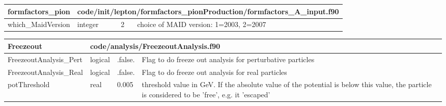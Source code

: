 \documentclass{article}
\begin{document}
\begin{longtable}{llll}
\toprule
\textbf{\large{formfactors\_pion}} & \multicolumn{3}{l}{\footnotesize{code/init/lepton/formfactors\_pionProduction/formfactors\_A\_input.f90}}\\*
\midrule
\endfirsthead
\midrule
\endhead
which\_MaidVersion & \begin{minipage}[t]{2cm}integer\end{minipage} & \begin{minipage}[t]{2cm}2\end{minipage} & \begin{minipage}[t]{12cm}choice of MAID version:  1=2003, 2=2007\end{minipage}\\*
\bottomrule
\end{longtable}
{ }




\begin{longtable}{llll}
\toprule
\textbf{\large{Freezeout}} & \multicolumn{3}{l}{\footnotesize{code/analysis/FreezeoutAnalysis.f90}}\\*
\midrule
\endfirsthead
\midrule
\endhead
FreezeoutAnalysis\_Pert & \begin{minipage}[t]{2cm}logical\end{minipage} & \begin{minipage}[t]{2cm}.false.\end{minipage} & \begin{minipage}[t]{12cm}Flag to do freeze out analysis for perturbative particles\end{minipage}\\*
\midrule
FreezeoutAnalysis\_Real & \begin{minipage}[t]{2cm}logical\end{minipage} & \begin{minipage}[t]{2cm}.false.\end{minipage} & \begin{minipage}[t]{12cm}Flag to do freeze out analysis for real particles\end{minipage}\\*
\midrule
potThreshold & \begin{minipage}[t]{2cm}real\end{minipage} & \begin{minipage}[t]{2cm}0.005\end{minipage} & \begin{minipage}[t]{12cm}threshold value in GeV. If the absolute value of the potential is below this value, the particle is considered to be 'free', e.g. it 'escaped'\end{minipage}\\*
\bottomrule
\end{longtable}
{ }
\end{document}
